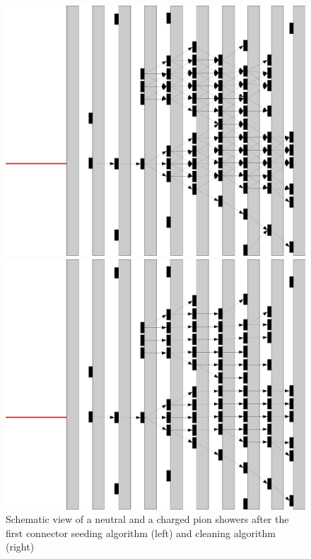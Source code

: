 \documentclass[cits]{JINST}
\begin{document}
\begin{figure}[!h]
  \begin{minipage}{0.49\linewidth}
    \begin{center}
      \includegraphics[width=0.9\linewidth]{ConnectorSeeding1.pdf}
    \end{center}
  \end{minipage}
  \begin{minipage}{0.49\linewidth}
    \begin{center}
      \includegraphics[width=0.9\linewidth]{ConnectorCleaning1.pdf}
    \end{center}
  \end{minipage}
  \caption{\label{ARBOR_CONNECTOR_SEEDING_1} \label{ARBOR_CONNECTOR_CLEANING_1} Schematic view of a neutral and a charged pion showers after the first connector seeding algorithm (left) and cleaning algorithm (right)}
\end{figure}
\end{document}
